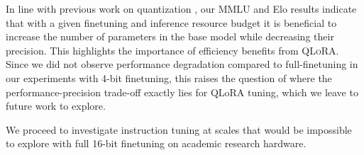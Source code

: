 \documentclass{article}
\newcommand{\method}{\textsc{QLoRA}\xspace}
\begin{document}
In line with previous work on quantization \citep{dettmers2022case}, our MMLU and Elo results indicate that with a given finetuning and inference resource budget it is beneficial to increase the number of parameters in the base model while decreasing their precision. This highlights the importance of efficiency benefits from \method. Since we did not observe performance degradation compared to full-finetuning in our experiments with 4-bit finetuning, this raises the question of where the performance-precision trade-off exactly lies for QLoRA tuning, which we leave to future work to explore.

We proceed to investigate instruction tuning at scales that would be impossible to explore with full 16-bit finetuning on academic research hardware.

\begin{table}[]
\centering
\caption{Mean 5-shot MMLU test accuracy for LLaMA 7-65B models finetuned with adapters on Alpaca and FLAN v2 for different data types. Overall, NF4 with double quantization (DQ) matches BFloat16 performance, while FP4 is consistently one percentage point behind both.}
\label{tbl:llama-datatype}
\end{table}
\end{document}
